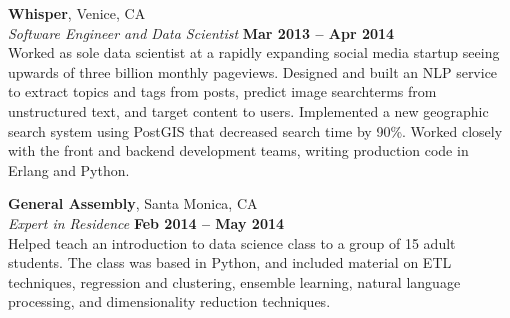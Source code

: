 \documentclass[margin,line]{resume}
\begin{document}
\begin{resume}
    \textbf{Whisper}, Venice, CA \vspace{2mm}\\\vspace{1mm}%
    \textsl{Software Engineer and Data Scientist} \hfill \textbf{Mar 2013 -- Apr 2014}\\
    Worked as sole data scientist at a rapidly expanding social media startup seeing upwards of three billion monthly pageviews. Designed and built an NLP service to extract topics and tags from posts, predict image searchterms from unstructured text, and target content to users. Implemented a new geographic search system using PostGIS that decreased search time by 90\%. Worked closely with the front and backend development teams, writing production code in Erlang and Python.

    \textbf{General Assembly}, Santa Monica, CA \vspace{2mm}\\\vspace{1mm}%
    \textsl{Expert in Residence} \hfill \textbf{Feb 2014 -- May 2014}\\
     Helped teach an introduction to data science class to a group of 15 adult students. The class was based in Python, and included material on ETL techniques, regression and clustering, ensemble learning, natural language processing, and dimensionality reduction techniques.


\end{resume}
\end{document}
